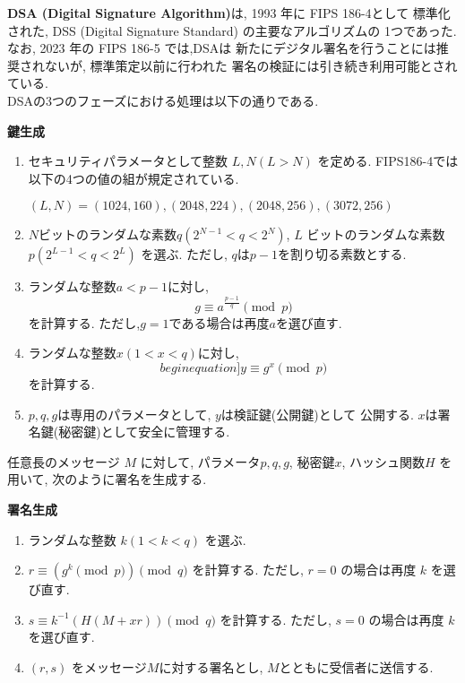 \textbf{DSA (Digital Signature Algorithm)}は, 1993 年に FIPS 186-4として
標準化された, DSS (Digital Signature Standard) の主要なアルゴリズムの
1つであった. なお, 2023 年の FIPS 186-5\cite{fips186-5} では,DSAは
新たにデジタル署名を行うことには推奨されないが, 標準策定以前に行われた
署名の検証には引き続き利用可能とされている.\\
\indent DSAの3つのフェーズにおける処理は以下の通りである.\\[0.5em]
\let\ltxlist\list
\begin{breakitembox}[l]{\textbf{鍵生成}}
  　
  \begin{enumerate}[parsep=7pt]
    \item セキュリティパラメータとして整数 $L,N (L>N)$ を定める. 
    FIPS186-4では以下の4つの値の組が規定されている.
    \begin{center}
      $(L,N) = (1024,160), (2048,224), (2048,256), (3072,256)$
    \end{center}
    \item $N$ビットのランダムな素数$q(2^{N-1}<q<2^{N})$, 
    $L$ ビットのランダムな素数$p(2^{L-1}<q<2^{L})$ を選ぶ.
    ただし, $q$は$p-1$を割り切る素数とする.
    \item ランダムな整数$a<p-1$に対し,
    \[
      g\equiv a^{\frac{p-1}{q}}\pmod p
    \] 
    を計算する. ただし,$g=1$である場合は再度$a$を選び直す.
    \item ランダムな整数$x(1<x<q)$に対し,
    \[begin{equation}]
      y\equiv g^x\pmod p
    \]
    を計算する.
    \item $p,q,g$は専用のパラメータとして, $y$は検証鍵(公開鍵)として
    公開する. $x$は署名鍵(秘密鍵)として安全に管理する.
  \end{enumerate}
\end{breakitembox}
\vspace{1em}
\indent 任意長のメッセージ $M$ に対して, パラメータ$p, q, g$, 秘密鍵$x$, 
ハッシュ関数$H$ を用いて, 次のように署名を生成する.
\vspace{1em}
\let\ltxlist\list
\begin{breakitembox}[l]{\textbf{署名生成}}
  　
  \begin{enumerate}[parsep=7pt]
    \item ランダムな整数 $k(1<k<q)$ を選ぶ.
    \item $r\equiv (g^k\pmod p)\pmod q$ を計算する. 
    ただし, $r=0$ の場合は再度 $k$ を選び直す.
    \item $s\equiv k^{-1}(H(M+xr))\pmod q$ を計算する.
    ただし, $s=0$ の場合は再度 $k$ を選び直す.
    \item $(r,s)$ をメッセージ$M$に対する署名とし, 
    $M$とともに受信者に送信する.
  \end{enumerate}
\end{breakitembox}
